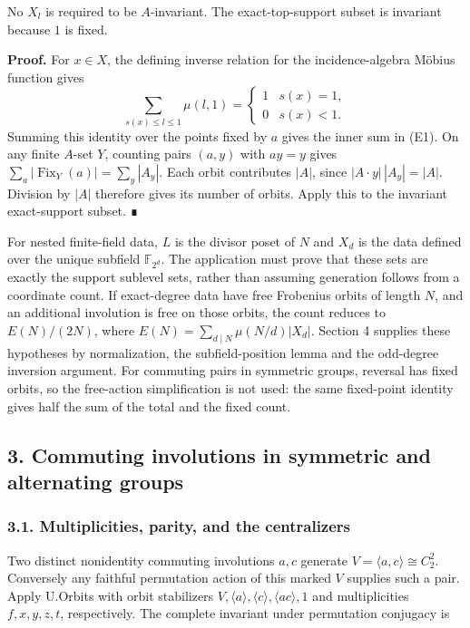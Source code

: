 \documentclass[
  11pt,
  a4paper,
]{article}
\begin{document}
No \(X_l\) is required to be \(A\)-invariant. The exact-top-support
subset is invariant because \(1\) is fixed.

\textbf{Proof.} For \(x\in X\), the defining inverse relation for the
incidence-algebra Möbius function gives \[
\sum_{s(x)\le l\le1}\mu(l,1)=
\begin{cases}1&s(x)=1,\\0&s(x)<1.\end{cases}
\] Summing this identity over the points fixed by \(a\) gives the inner
sum in (E1). On any finite \(A\)-set \(Y\), counting pairs \((a,y)\)
with \(ay=y\) gives \(\sum_a|\operatorname{Fix}_Y(a)|=\sum_y|A_y|\).
Each orbit contributes \(|A|\), since \(|A\cdot y|\,|A_y|=|A|\).
Division by \(|A|\) therefore gives its number of orbits. Apply this to
the invariant exact-support subset. ∎

For nested finite-field data, \(L\) is the divisor poset of \(N\) and
\(X_d\) is the data defined over the unique subfield
\(\mathbb F_{2^d}\). The application must prove that these sets are
exactly the support sublevel sets, rather than assuming generation
follows from a coordinate count. If exact-degree data have free
Frobenius orbits of length \(N\), and an additional involution is free
on those orbits, the count reduces to \(E(N)/(2N)\), where
\(E(N)=\sum_{d\mid N}\mu(N/d)|X_d|\). Section 4 supplies these
hypotheses by normalization, the subfield-position lemma and the
odd-degree inversion argument. For commuting pairs in symmetric groups,
reversal has fixed orbits, so the free-action simplification is not
used: the same fixed-point identity gives half the sum of the total and
the fixed count.

\subsection{3. Commuting involutions in symmetric and alternating
groups}\label{commuting-involutions-in-symmetric-and-alternating-groups}

\subsubsection{3.1. Multiplicities, parity, and the
centralizers}\label{multiplicities-parity-and-the-centralizers}

Two distinct nonidentity commuting involutions \(a,c\) generate
\(V=\langle a,c\rangle\cong C_2^2\). Conversely any faithful permutation
action of this marked \(V\) supplies such a pair. Apply U.Orbits with
orbit stabilizers
\(V,\langle a\rangle,\langle c\rangle,\langle ac\rangle,1\) and
multiplicities \(f,x,y,z,t\), respectively. The complete invariant under
permutation conjugacy is
\end{document}
